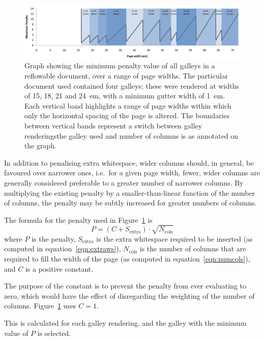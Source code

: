 \begin{figure}
 \includegraphics[width=\textwidth]{gfx/graph-em}
 \caption[Graph of minimum penalty values]{Graph showing the minimum penalty value of all galleys in a reflowable document, over a range of page widths. The particular document used contained four galleys; these were rendered at widths of 15, 18, 21 and 24~em, with a minimum gutter width of 1~em. Each vertical band highlights a range of page widths within which only the horizontal spacing of the page is altered. The boundaries between vertical bands represent a switch between galley renderings\ed{}the galley used and number of columns is as annotated on the graph.}
 \label{fig:penaltygraph}
\end{figure}

In addition to penalising extra whitespace, wider columns should, in general, be favoured over narrower ones, i.e.~for a given page width, fewer, wider columns are generally considered preferable to a greater number of narrower columns. By multiplying the existing penalty by a smaller-than-linear function of the number of columns, the penalty may be subtly increased for greater numbers of columns.

The formula for the penalty used in Figure~\ref{fig:penaltygraph} is \begin{equation}P = (C + S_\text{extra})\cdot\sqrt{N_\text{cols}}\end{equation} where $P$ is the penalty, $S_\text{extra}$ is the extra whitespace required to be inserted (as computed in equation~\ref{eqn:extraws}), $N_\text{cols}$ is the number of columns that are required to fill the width of the page (as computed in equation~\ref{eqn:numcols}), and $C$ is a positive constant.

The purpose of the constant is to prevent the penalty from ever evaluating to zero, which would have the effect of disregarding the weighting of the number of columns. Figure~\ref{fig:penaltygraph} uses $C=1$.

This is calculated for each galley rendering, and the galley with the minimum value of $P$ is selected.


